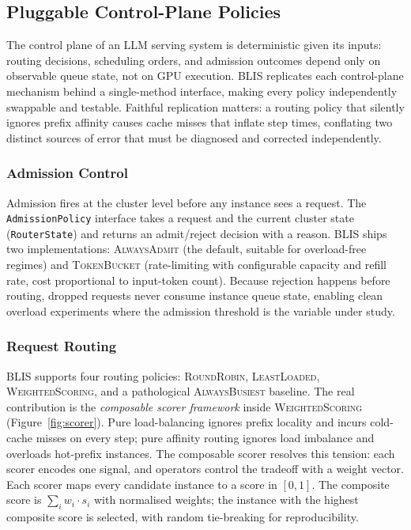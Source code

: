 \documentclass[11pt]{article}
\theoremstyle{plain} %
\theoremstyle{definition} %
\theoremstyle{remark} %
\newcommand{\code}[1]{\texttt{#1}}
\numberwithin{equation}{section}
\begin{document}
\subsection{Pluggable Control-Plane Policies}
\label{subsec:design-policies}

The control plane of an LLM serving system is deterministic given its inputs:
routing decisions, scheduling orders, and admission outcomes depend only on
observable queue state, not on GPU execution.
BLIS replicates each control-plane mechanism behind a single-method interface,
making every policy independently swappable and testable.
Faithful replication matters: a routing policy that silently ignores prefix
affinity causes cache misses that inflate step times, conflating two distinct
sources of error that must be diagnosed and corrected independently.

\subsubsection{Admission Control}
\label{subsubsec:admission}

Admission fires at the cluster level before any instance sees a request.
The \code{AdmissionPolicy} interface takes a request and the current cluster
state (\code{RouterState}) and returns an admit/reject decision with a reason.
BLIS ships two implementations: \textsc{AlwaysAdmit} (the default,
suitable for overload-free regimes) and \textsc{TokenBucket} (rate-limiting
with configurable capacity and refill rate, cost proportional to input-token
count).
Because rejection happens before routing, dropped requests never consume
instance queue state, enabling clean overload experiments where the admission
threshold is the variable under study.

\subsubsection{Request Routing}
\label{subsubsec:routing}

\begin{sloppypar}
BLIS supports four routing policies: \textsc{RoundRobin},
\textsc{LeastLoaded}, \textsc{WeightedScoring}, and a pathological
\textsc{AlwaysBusiest} baseline.
The real contribution is the \emph{composable scorer framework} inside
\textsc{WeightedScoring} (Figure~\ref{fig:scorer}).
Pure load-balancing ignores prefix locality and incurs cold-cache misses on
every step; pure affinity routing ignores load imbalance and overloads
hot-prefix instances.
The composable scorer resolves this tension: each scorer encodes one signal,
and operators control the tradeoff with a weight vector.
Each scorer maps every candidate instance to a score in $[0,1]$.
The composite score is $\sum_i w_i \cdot s_i$ with normalised weights;
the instance with the highest composite score is selected, with random
tie-breaking for reproducibility.
\end{sloppypar}
\end{document}

